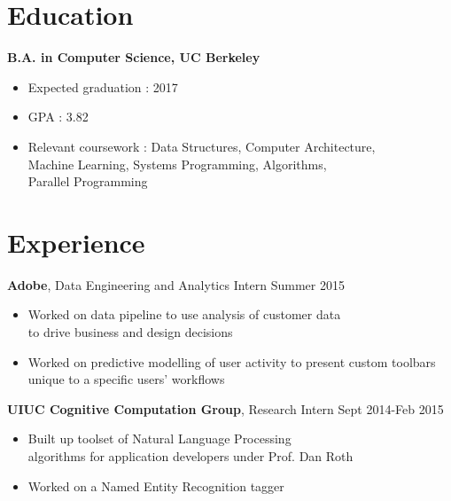 \documentclass[margin]{res}
\begin{document}
 


\begin{resume} 
  

  \section{Education} 
          {\bf B.A. in Computer Science, UC Berkeley}
          \begin{itemize} \itemsep -3pt
          \item Expected graduation : 2017
	  \item GPA : 3.82
	  \item Relevant coursework : Data Structures, Computer Architecture,\\ Machine Learning, Systems Programming, Algorithms,\\ Parallel Programming
          \end{itemize}
          

          \section{Experience}
                  {\bf Adobe}, Data Engineering and Analytics Intern \hfill Summer 2015
                  \begin{itemize} \itemsep -3pt
                  \item Worked on data pipeline to use analysis of customer data \\to drive business and design decisions
                  \item Worked on predictive modelling of user activity to present custom toolbars unique to a specific users' workflows
                  \end{itemize}
                  
                  {\bf UIUC Cognitive Computation Group}, Research Intern \hfill Sept 2014-Feb 2015
                  \begin{itemize} \itemsep -3pt
                  \item Built up toolset of Natural Language Processing \\
                    algorithms for application developers under Prof. Dan Roth
                  \item Worked on a Named Entity Recognition tagger
                  \end{itemize}
                  

\end{resume}
\end{document}
